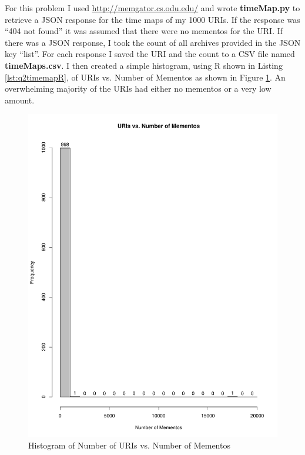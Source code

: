 \documentclass[letterpaper,11pt]{article}
\newcommand*{\srcPath}{../src}%
\begin{document}
For this problem I used  \url{http://memgator.cs.odu.edu/} and wrote \textbf{timeMap.py} to retrieve a JSON response for the time maps of my 1000 URIs. If the response was ``404 not found'' it was assumed that there were no mementos for the URI. If there was a JSON response, I took the count of all archives provided in the JSON key ``list''. For each response I saved the URI and the count to a CSV file named \textbf{timeMaps.csv}. I then created a simple histogram, using R shown in Listing \ref{lst:q2timemapR}, of URIs vs. Number of Mementos as shown in Figure \ref{fig:q2histogram}. An overwhelming majority of the URIs had either no mementos or a very low amount.



\begin{figure}[h]
\centering
\includegraphics[scale=0.6]{timemapHistogram.pdf}
\caption{Histogram of Number of URIs vs. Number of Mementos}
\label{fig:q2histogram}
\end{figure}
\end{document}
